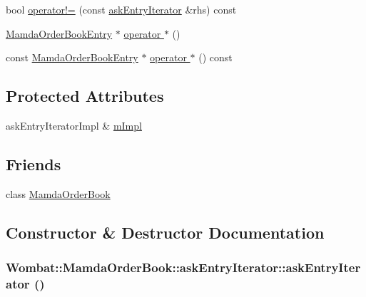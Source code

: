 \begin{CompactItemize}
\item 
bool \hyperlink{classWombat_1_1MamdaOrderBook_1_1askEntryIterator_ff86ee5ad92b683c1c976cbb842149f8}{operator!=} (const \hyperlink{classWombat_1_1MamdaOrderBook_1_1askEntryIterator}{ask\-Entry\-Iterator} \&rhs) const 
\item 
\hyperlink{classWombat_1_1MamdaOrderBookEntry}{Mamda\-Order\-Book\-Entry} $\ast$ \hyperlink{classWombat_1_1MamdaOrderBook_1_1askEntryIterator_ede48a9aabc2ae2b7d68e1a12d197144}{operator $\ast$} ()
\item 
const \hyperlink{classWombat_1_1MamdaOrderBookEntry}{Mamda\-Order\-Book\-Entry} $\ast$ \hyperlink{classWombat_1_1MamdaOrderBook_1_1askEntryIterator_2725e05e0ee8fb6243329b87eb98afd7}{operator $\ast$} () const 
\end{CompactItemize}
\subsection*{Protected Attributes}
\begin{CompactItemize}
\item 
ask\-Entry\-Iterator\-Impl \& \hyperlink{classWombat_1_1MamdaOrderBook_1_1askEntryIterator_147b01c1ef982afae2140e2485418be3}{m\-Impl}
\end{CompactItemize}
\subsection*{Friends}
\begin{CompactItemize}
\item 
class \hyperlink{classWombat_1_1MamdaOrderBook_1_1askEntryIterator_51cb271c9914c74f99c60cb638c26be7}{Mamda\-Order\-Book}
\end{CompactItemize}


\subsection{Constructor \& Destructor Documentation}
\hypertarget{classWombat_1_1MamdaOrderBook_1_1askEntryIterator_9cce173ec31e42c1e2f236c2f7baeefc}{
\subsubsection[askEntryIterator]{\setlength{\rightskip}{0pt plus 5cm}Wombat::Mamda\-Order\-Book::ask\-Entry\-Iterator::ask\-Entry\-Iterator ()}}
\label{classWombat_1_1MamdaOrderBook_1_1askEntryIterator_9cce173ec31e42c1e2f236c2f7baeefc}


